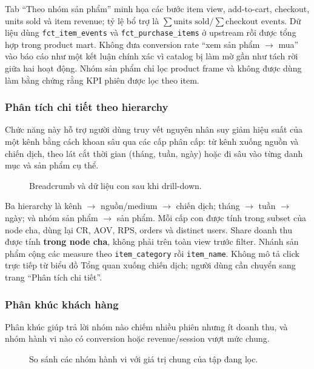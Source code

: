 Tab ``Theo nhóm sản phẩm'' minh họa các bước item view, add-to-cart, checkout, units sold và item revenue; tỷ lệ bổ trợ là $\sum\text{units sold}/\sum\text{checkout events}$. Dữ liệu dùng \texttt{fct\_item\_events} và \texttt{fct\_purchase\_items} ở upstream rồi được tổng hợp trong product mart. Không đưa conversion rate ``xem sản phẩm $\rightarrow$ mua'' vào báo cáo như một kết luận chính xác vì catalog bị làm mờ gần như tách rời giữa hai hoạt động. Nhóm sản phẩm chỉ lọc product frame và không được dùng làm bằng chứng rằng KPI phiên được lọc theo item.

\subsubsection{Phân tích chi tiết theo hierarchy}

Chức năng này hỗ trợ người dùng truy vết nguyên nhân suy giảm hiệu suất của một kênh bằng cách khoan sâu qua các cấp phân cấp: từ kênh xuống nguồn và chiến dịch, theo lát cắt thời gian (tháng, tuần, ngày) hoặc đi sâu vào từng danh mục và sản phẩm cụ thể.

\begin{figure}[H]
  \centering
  \caption{Breadcrumb và dữ liệu con sau khi drill-down.}
  \label{fig:ui-drilldown}
\end{figure}

Ba hierarchy là kênh $\rightarrow$ nguồn/medium $\rightarrow$ chiến dịch; tháng $\rightarrow$ tuần $\rightarrow$ ngày; và nhóm sản phẩm $\rightarrow$ sản phẩm. Mỗi cấp con được tính trong subset của node cha, dùng lại CR, AOV, RPS, orders và distinct users. Share doanh thu được tính \textbf{trong node cha}, không phải trên toàn view trước filter. Nhánh sản phẩm cộng các measure theo \texttt{item\_category} rồi \texttt{item\_name}. Không mô tả click trực tiếp từ biểu đồ Tổng quan xuống chiến dịch; người dùng cần chuyển sang trang ``Phân tích chi tiết''.

\subsubsection{Phân khúc khách hàng}

Phân khúc giúp trả lời nhóm nào chiếm nhiều phiên nhưng ít doanh thu, và nhóm hành vi nào có conversion hoặc revenue/session vượt mức chung.

\begin{figure}[H]
  \centering
  \caption{So sánh các nhóm hành vi với giá trị chung của tập đang lọc.}
  \label{fig:ui-segments}
\end{figure}

